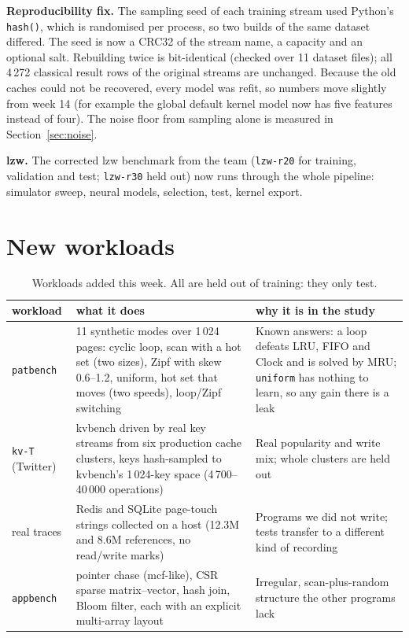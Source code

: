 \documentclass[10.5pt,a4paper]{article}
\newcommand{\code}[1]{\texttt{#1}}
\begin{document}
\textbf{Reproducibility fix.} The sampling seed of each training stream used Python's \code{hash()}, which is
randomised per process, so two builds of the same dataset differed. The seed is now a CRC32 of the stream name, a
capacity and an optional salt. Rebuilding twice is bit-identical (checked over 11 dataset files); all 4\,272
classical result rows of the original streams are unchanged. Because the old caches could not be recovered,
every model was refit, so numbers move slightly from week 14 (for example the global default kernel model now
has five features instead of four). The noise floor from sampling alone is measured in Section~\ref{sec:noise}.

\textbf{lzw.} The corrected lzw benchmark from the team (\code{lzw-r20} for training, validation and test;
\code{lzw-r30} held out) now runs through the whole pipeline: simulator sweep, neural models, selection, test,
kernel export.

\section{New workloads}

\begin{table}[h]
\centering\small
\begin{tabular}{p{2.4cm}p{6.8cm}p{4.6cm}}
\toprule
workload & what it does & why it is in the study \\
\midrule
\code{patbench} & 11 synthetic modes over 1\,024 pages: cyclic loop, scan with a hot set (two sizes),
Zipf with skew 0.6--1.2, uniform, hot set that moves (two speeds), loop/Zipf switching & Known answers: a loop defeats LRU, FIFO and Clock and
is solved by MRU; \code{uniform} has nothing to learn, so any gain there is a leak \\
\code{kv-T} (Twitter) & kvbench driven by real key streams from six production cache clusters, keys hash-sampled
to kvbench's 1\,024-key space (4\,700--40\,000 operations) & Real popularity and write mix; whole
clusters are held out \\
real traces & Redis and SQLite page-touch strings collected on a host (12.3M and 8.6M references, no read/write
marks) & Programs we did not write; tests transfer to a different kind of recording \\
\code{appbench} & pointer chase (mcf-like), CSR sparse matrix--vector, hash join, Bloom filter, each with an
explicit multi-array layout & Irregular, scan-plus-random structure the other programs lack \\
\bottomrule
\end{tabular}
\caption{Workloads added this week. All are held out of training: they only test.}
\end{table}
\end{document}
